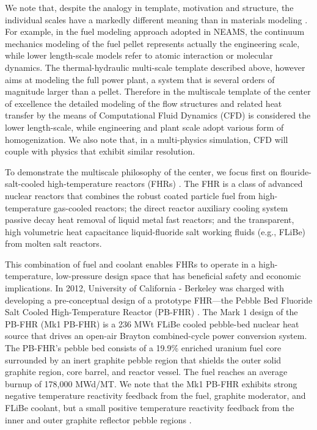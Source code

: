 We note that, despite the analogy in template, motivation and structure,  the individual scales have a markedly different meaning than in materials modeling \cite{tonks2013multiscale}. For example, in the fuel modeling approach adopted in NEAMS, the continuum mechanics modeling of the fuel pellet represents actually the engineering scale, while lower length-scale models refer to atomic interaction or molecular dynamics.
The thermal-hydraulic multi-scale template described above, however aims at modeling the full power plant, a system that is several orders of magnitude larger than a pellet.  Therefore in the multiscale template of the center of excellence the detailed modeling of the flow structures and related heat transfer  by the means of Computational Fluid Dynamics (CFD) is considered the lower length-scale, while engineering and plant scale adopt various form of homogenization. We also note that, in a multi-physics simulation, CFD will couple with physics that exhibit similar resolution.

To demonstrate the multiscale philosophy of the center, we focus first on flouride-salt-cooled high-temperature reactors (FHRs) \cite{forsberg2015fluoride}. The FHR is a class of advanced nuclear reactors that combines the robust coated particle fuel from high-temperature gas-cooled reactors; the direct reactor auxiliary cooling system passive decay heat removal of liquid metal fast reactors; and the transparent, high volumetric heat capacitance liquid-fluoride salt working fluids (e.g., FLiBe) from molten salt reactors.

This combination of fuel and coolant enables FHRs to operate in a high-temperature, low-pressure design space that has beneficial safety and economic implications. In 2012, University of California - Berkeley was charged with developing a pre-conceptual design of a prototype FHR---the Pebble Bed Fluoride Salt Cooled High-Temperature Reactor (PB-FHR) \cite{cisneros2014technical}. The Mark 1 design of the PB-FHR (Mk1 PB-FHR) is a 236 MWt FLiBe cooled pebble-bed nuclear heat source that drives an open-air Brayton combined-cycle power conversion system. The PB-FHR's pebble bed consists of a 19.9\% enriched uranium fuel core surrounded by an inert graphite pebble region that shields the outer solid graphite region, core barrel, and reactor vessel. The fuel reaches an average burnup of 178,000 MWd/MT. We note that the Mk1 PB-FHR exhibits strong negative temperature reactivity feedback from the fuel, graphite moderator, and FLiBe coolant, but a small positive temperature reactivity feedback from the inner  and outer graphite reflector pebble regions \cite{cisneros2014technical}.

